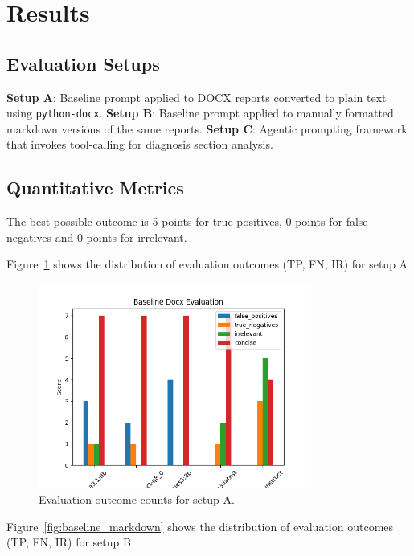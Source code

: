\section{Results}

\subsection{Evaluation Setups}

\textbf{Setup A}: Baseline prompt applied to DOCX reports converted to plain text using \texttt{python-docx}.  
\textbf{Setup B}: Baseline prompt applied to manually formatted markdown versions of the same reports.  
\textbf{Setup C}: Agentic prompting framework that invokes tool-calling for diagnosis section analysis.

\subsection{Quantitative Metrics}
The best possible outcome is 5 points for true positives, 0 points for false
negatives and 0 points for irrelevant.

Figure~\ref{fig:baseline_docx} shows the distribution of evaluation outcomes
(TP, FN, IR) for setup A

\begin{figure}[H]
  \centering
  \includegraphics[width=0.8\textwidth]{baseline_docx.png}
  \caption{Evaluation outcome counts for setup A.}
  \label{fig:baseline_docx}
\end{figure}

Figure~\ref{fig:baseline_markdown} shows the distribution of evaluation outcomes
(TP, FN, IR) for setup B

